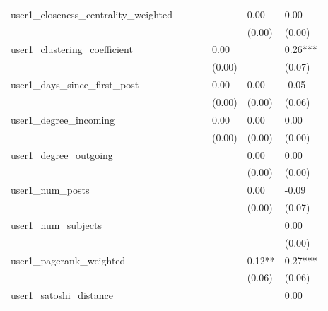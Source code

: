 \begin{table}
\begin{center}
\begin{tabular}{lllllll}
user1_closeness_centrality_weighted            &          &         &         &         & 0.00     & 0.00       \\
                                               &          &         &         &         & (0.00)   & (0.00)     \\
user1_clustering_coefficient                   &          &         &         & 0.00    &          & 0.26***    \\
                                               &          &         &         & (0.00)  &          & (0.07)     \\
user1_days_since_first_post                    &          &         &         & 0.00    & 0.00     & -0.05      \\
                                               &          &         &         & (0.00)  & (0.00)   & (0.06)     \\
user1_degree_incoming                          &          &         &         & 0.00    & 0.00     & 0.00       \\
                                               &          &         &         & (0.00)  & (0.00)   & (0.00)     \\
user1_degree_outgoing                          &          &         &         &         & 0.00     & 0.00       \\
                                               &          &         &         &         & (0.00)   & (0.00)     \\
user1_num_posts                                &          &         &         &         & 0.00     & -0.09      \\
                                               &          &         &         &         & (0.00)   & (0.07)     \\
user1_num_subjects                             &          &         &         &         &          & 0.00       \\
                                               &          &         &         &         &          & (0.00)     \\
user1_pagerank_weighted                        &          &         &         &         & 0.12**   & 0.27***    \\
                                               &          &         &         &         & (0.06)   & (0.06)     \\
user1_satoshi_distance                         &          &         &         &         &          & 0.00       \\

\end{tabular}
\end{center}
\end{table}
